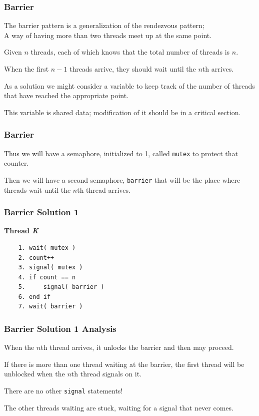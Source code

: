 \begin{frame}
\frametitle{Barrier}

The barrier pattern is a generalization of the rendezvous pattern;\\
\quad A way of having more than two threads meet up at the same point. 

Given $n$ threads, each of which knows that the total number of threads is $n$.

When the first $n-1$ threads arrive, they should wait until the $n$th arrives. 

As a solution we might consider a variable to keep track of the number of threads that have reached the appropriate point. 

This variable is shared data; modification of it should be in a critical section.


\end{frame}

\begin{frame}
\frametitle{Barrier}

Thus we will have a semaphore, initialized to 1, called \texttt{mutex} to protect that counter.

 Then we will have a second semaphore, \texttt{barrier} that will be the place where threads wait until the $n$th thread arrives.


\end{frame}

\begin{frame}[fragile]
\frametitle{Barrier Solution 1}

\textbf{Thread \textit{K}}\vspace{-10em}
  \begin{verbatim}
	1. wait( mutex )
	2. count++
	3. signal( mutex )
	4. if count == n
	5.     signal( barrier )
	6. end if
	7. wait( barrier )
  \end{verbatim}
\vspace{-2em}


\end{frame}

\begin{frame}
\frametitle{Barrier Solution 1 Analysis}

When the $n$th thread arrives, it unlocks the barrier and then may proceed. 

If there is more than one thread waiting at the barrier, the first thread will be unblocked when the $n$th thread signals on it.

There are no other \texttt{signal} statements!

The other threads waiting are stuck, waiting for a signal that never comes.


\end{frame}

